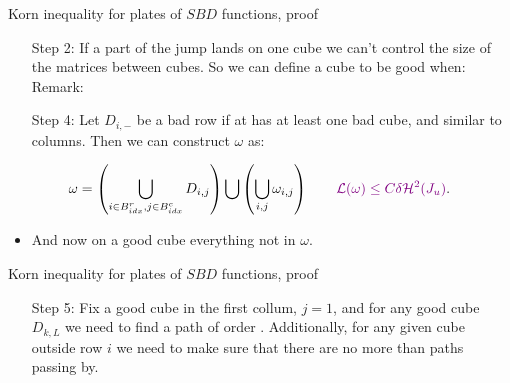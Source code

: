 \documentclass{beamer}
\begin{document}
\begin{frame}{Korn inequality for plates  of $SBD$ functions, proof}
    \begin{itemize}[leftmargin = 1.5cm]
        \item[Step 2:] If a part of the jump lands on one cube we can't control the size of the matrices between cubes. So we can define a cube to be good when:
    \pause
    Remark: 
    \pause\vfill
        \item[Step 4:] Let $D_{i,-}$ be a bad row if at has at least one bad cube, and similar to columns. Then we can construct $\omega$ as:
    \end{itemize}
        \vfill
        $$\omega = \left(\bigcup_{i\in B^r_{idx},j\in B^c_{idx}}D_{i,j}\right)\bigcup \left(\bigcup_{i,j} \omega_{i,j}\right)\qquad \textcolor{violet}{{\mathcal L}(\omega)\leq C \delta {\mathcal H}^2(J_u)}.$$
    \begin{itemize}[leftmargin= 1.5cm] 
        \vfill\pause
        \item And now on a good cube everything not in $\omega$.
    \end{itemize}
\end{frame}

\begin{frame}{Korn inequality for plates  of $SBD$ functions, proof}
\begin{itemize}[leftmargin = 1.5cm]
    \item[Step 5:] Fix a good cube in the first collum, $j=1$, and for any good cube $D_{k,L}$ we need to find a path of order . Additionally, for any given cube outside row $i$ we need to make sure that there are no more than  paths passing by.
\end{itemize}
 
\end{frame}
\end{document}
